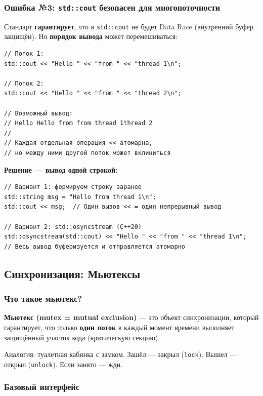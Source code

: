 \documentclass[a4paper,12pt]{article}
\begin{document}
\subsubsection{Ошибка №3: \texttt{std::cout} безопасен для многопоточности}

Стандарт \textbf{гарантирует}, что в \texttt{std::cout} не будет Data Race
(внутренний буфер защищён). Но \textbf{порядок вывода} может перемешиваться:

\begin{lstlisting}
// Поток 1:
std::cout << "Hello " << "from " << "thread 1\n";

// Поток 2:
std::cout << "Hello " << "from " << "thread 2\n";

// Возможный вывод:
// Hello Hello from from thread 1thread 2
//
// Каждая отдельная операция << атомарна,
// но между ними другой поток может вклиниться
\end{lstlisting}

\textbf{Решение --- вывод одной строкой:}

\begin{lstlisting}
// Вариант 1: формируем строку заранее
std::string msg = "Hello from thread 1\n";
std::cout << msg;  // Один вызов << = один непрерывный вывод

// Вариант 2: std::osyncstream (C++20)
std::osyncstream(std::cout) << "Hello " << "from " << "thread 1\n";
// Весь вывод буферизуется и отправляется атомарно
\end{lstlisting}

\subsection{Синхронизация: Мьютексы}

\subsubsection{Что такое мьютекс?}

\textbf{Мьютекс (mutex = mutual exclusion)} --- это объект синхронизации,
который гарантирует, что только \textbf{один поток} в каждый момент времени
выполняет защищённый участок кода (критическую секцию).

Аналогия: туалетная кабинка с замком. Зашёл --- закрыл (\texttt{lock}).
Вышел --- открыл (\texttt{unlock}). Если занято --- жди.

\subsubsection{Базовый интерфейс}
\end{document}
